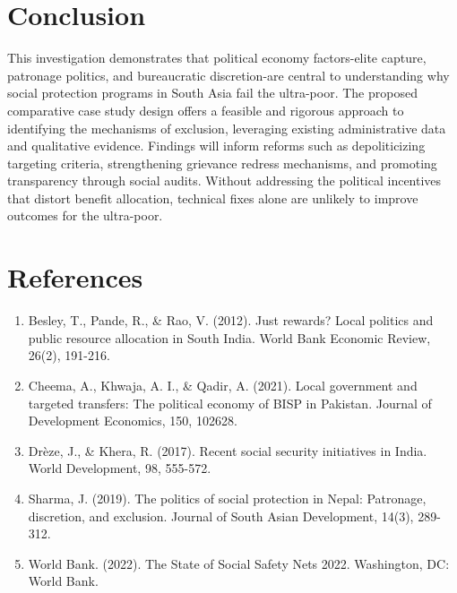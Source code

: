 \documentclass[10pt]{article}
\begin{document}
\section*{Conclusion}
This investigation demonstrates that political economy factors-elite capture, patronage politics, and bureaucratic discretion-are central to understanding why social protection programs in South Asia fail the ultra-poor. The proposed comparative case study design offers a feasible and rigorous approach to identifying the mechanisms of exclusion, leveraging existing administrative data and qualitative evidence. Findings will inform reforms such as depoliticizing targeting criteria, strengthening grievance redress mechanisms, and promoting transparency through social audits. Without addressing the political incentives that distort benefit allocation, technical fixes alone are unlikely to improve outcomes for the ultra-poor.

\section*{References}
\begin{enumerate}[leftmargin=*]
\item Besley, T., Pande, R., \& Rao, V. (2012). Just rewards? Local politics and public resource allocation in South India. World Bank Economic Review, 26(2), 191-216.
\item Cheema, A., Khwaja, A. I., \& Qadir, A. (2021). Local government and targeted transfers: The political economy of BISP in Pakistan. Journal of Development Economics, 150, 102628.
\item Drèze, J., \& Khera, R. (2017). Recent social security initiatives in India. World Development, 98, 555-572.
\item Sharma, J. (2019). The politics of social protection in Nepal: Patronage, discretion, and exclusion. Journal of South Asian Development, 14(3), 289-312.
\item World Bank. (2022). The State of Social Safety Nets 2022. Washington, DC: World Bank.
\end{enumerate}
\end{document}
